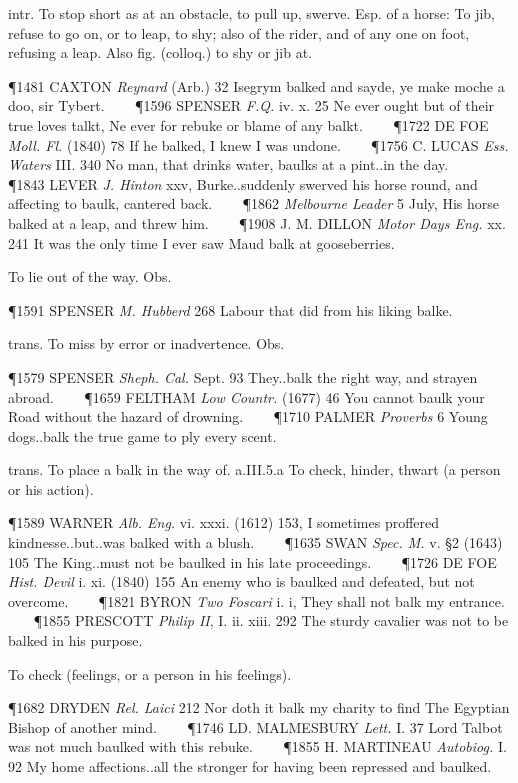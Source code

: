 \begin{description}[wide, labelwidth=!, labelindent=0pt]
\begin{myenumerate}
 intr. To stop short as at an obstacle, to pull up, swerve. Esp. of a horse: To jib, refuse to go on, or to leap, to shy; also of the rider, and of any one on foot, refusing a leap. Also fig. (colloq.) to shy or jib at.

\P 1481 CAXTON  \textit{Reynard} (Arb.) 32 Isegrym balked and sayde, ye make moche a doo, sir Tybert.    
\P 1596 SPENSER  \textit{F.Q.} iv. x. 25 Ne ever ought but of their true loves talkt, Ne ever for rebuke or blame of any balkt.    
\P 1722 DE FOE  \textit{Moll. Fl.} (1840) 78 If he balked, I knew I was undone.    
\P 1756 C. LUCAS  \textit{Ess. Waters} III. 340 No man, that drinks water, baulks at a pint..in the day.    
\P 1843 LEVER  \textit{J. Hinton} xxv, Burke..suddenly swerved his horse round, and affecting to baulk, cantered back.    
\P 1862 \textit{Melbourne  Leader} 5 July, His horse balked at a leap, and threw him.    
\P 1908 J. M. DILLON  \textit{Motor Days Eng.} xx. 241 It was the only time I ever saw Maud balk at gooseberries.

 To lie out of the way. Obs.

\P 1591 SPENSER  \textit{M. Hubberd} 268 Labour that did from his liking balke.

 trans. To miss by error or inadvertence. Obs.

\P 1579 SPENSER  \textit{Sheph. Cal.} Sept. 93 They..balk the right way, and strayen abroad.    
\P 1659 FELTHAM  \textit{Low Countr.} (1677) 46 You cannot baulk your Road without the hazard of drowning.    
\P 1710 PALMER  \textit{Proverbs} 6 Young dogs..balk the true game to ply every scent.

 trans. To place a balk in the way of. a.III.5.a To check, hinder, thwart (a person or his action).

\P 1589 WARNER  \textit{Alb. Eng.} vi. xxxi. (1612) 153, I sometimes proffered kindnesse..but..was balked with a blush.    
\P 1635 SWAN  \textit{Spec. M.} v. §2 (1643) 105 The King..must not be baulked in his late proceedings.    
\P 1726 DE FOE  \textit{Hist. Devil} i. xi. (1840) 155 An enemy who is baulked and defeated, but not overcome.    
\P 1821 BYRON  \textit{Two Foscari} i. i, They shall not balk my entrance.    
\P 1855 PRESCOTT  \textit{Philip II}, I. ii. xiii. 292 The sturdy cavalier was not to be balked in his purpose.

 To check (feelings, or a person in his feelings).

\P 1682 DRYDEN  \textit{Rel. Laici} 212 Nor doth it balk my charity to find The Egyptian Bishop of another mind.    
\P 1746 LD. MALMESBURY  \textit{Lett.} I. 37 Lord Talbot was not much baulked with this rebuke.    
\P 1855 H. MARTINEAU  \textit{Autobiog.} I. 92 My home affections..all the stronger for having been repressed and baulked.


\end{myenumerate}
\end{description}
